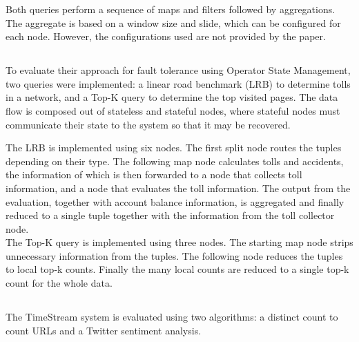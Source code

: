 
Both queries perform a sequence of maps and filters followed by aggregations. The aggregate is based on a window size and slide, which can be configured for each node. However, the configurations used are not provided by the paper.

\subsection{}
To evaluate their approach for fault tolerance using Operator State Management, two queries were implemented: a linear road benchmark (LRB) to determine tolls in a network, and a Top-K query to determine the top visited pages. The data flow is composed out of stateless and stateful nodes, where stateful nodes must communicate their state to the system so that it may be recovered. \\


The LRB is implemented using six nodes. The first split node routes the tuples depending on their type. The following map node calculates tolls and accidents, the information of which is then forwarded to a node that collects toll information, and a node that evaluates the toll information. The output from the evaluation, together with account balance information, is aggregated and finally reduced to a single tuple together with the information from the toll collector node. \\

The Top-K query is implemented using three nodes. The starting map node strips unnecessary information from the tuples. The following node reduces the tuples to local top-k counts. Finally the many local counts are reduced to a single top-k count for the whole data.

\subsection{}
The TimeStream system is evaluated using two algorithms: a distinct count to count URLs and a Twitter sentiment analysis. \\



